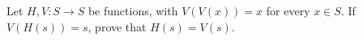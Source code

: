 Let $H,V:S\to S$ be functions, with $V(V(x))=x$ for every $x\in S$. If $V(H(s))=s$, prove that $H(s)=V(s)$.
